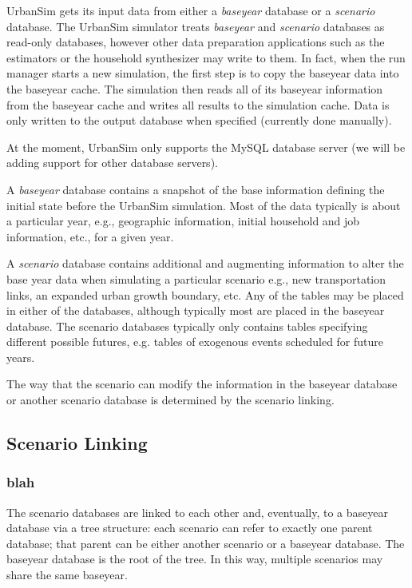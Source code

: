UrbanSim gets its input data from either a \emph{baseyear} database or a
\emph{scenario} database.  The UrbanSim simulator treats \emph{baseyear} and
\emph{scenario} databases as read-only databases, however other data
preparation applications such as the estimators or the household synthesizer
may write to them.  In fact, when the run manager starts a new simulation, the
first step is to copy the baseyear data into the baseyear cache. \baseyearcacheindex The
simulation then reads all of its baseyear information from the baseyear cache \baseyearcacheindex
and writes all results to the simulation cache. \simulationcacheindex Data is only written to the
output database when specified (currently done manually).

At the moment, UrbanSim only supports the MySQL \mysqlindex database server (we will be
adding support for other database servers).

A \emph{baseyear} database contains a snapshot of the base
information defining the initial state before the UrbanSim
simulation. Most of the data typically is about a particular year,
e.g., geographic information, initial household and job information,
etc., for a given year.

A \emph{scenario} database contains additional and augmenting information to
alter the base year data when simulating a particular scenario e.g., new
transportation links, an expanded urban growth boundary, etc. Any of the tables
may be placed in either of the databases, although typically most are placed in
the baseyear database.  The scenario databases typically only contains tables
specifying different possible futures, e.g. tables of exogenous events
scheduled for future years.

The way that the scenario can modify the information in the baseyear database or
another scenario database is determined by the scenario linking.

\subsection{Scenario Linking}
\subsubsection{blah}

The scenario databases are linked to each other and, eventually, to a baseyear
database via a tree structure: each scenario can refer to exactly one parent
database; that parent can be either another scenario or a baseyear database.
The baseyear database is the root of the tree.  In this way, multiple scenarios
may share the same baseyear.

